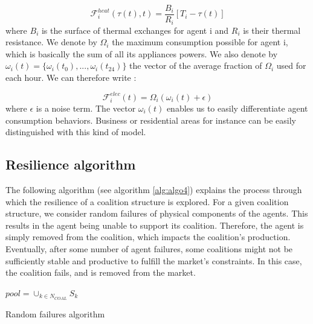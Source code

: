 \documentclass[journal]{IEEEtran}
\begin{document}
\begin{equation}
\mathcal{F}_{i}^{heat}(\tau(t), t) = \dfrac{B_{i}}{R_{i}} \left[ T_{i} - \tau(t) \right]
\end{equation}
where $ B_{i} $ is the surface of thermal exchanges for agent i and $ R_{i} $ is their thermal resistance. We denote by $ \Omega_{i} $ the maximum consumption possible for agent i, which is basically the sum of all its appliances powers. We also denote by $ \omega_{i}(t) = \{ \omega_{i}(t_{0}),...,\omega_{i}(t_{24}) \} $ the vector of the average fraction of $ \Omega_{i} $ used for each hour. We can therefore write :

\begin{equation}
\mathcal{F}_{i}^{elec}(t) = \Omega_{i} ( \omega_{i}(t) + \epsilon )
\end{equation}
where $ \epsilon $ is a noise term. The vector $ \omega_{i}(t) $ enables us to easily differentiate agent consumption behaviors. Business or residential areas for instance can be easily distinguished with this kind of model.

\subsection{Resilience algorithm}
\label{appendix_resilience}
The following algorithm (see algorithm \ref{alg:algo4}) explains the process through which the resilience of a coalition structure is explored. For a given coalition structure, we consider random failures of physical components of the agents. This results in the agent being unable to support its coalition. Therefore, the agent is simply removed from the coalition, which impacts the coalition's production. Eventually, after some number of agent failures, some coalitions might not be sufficiently stable and productive to fulfill the market's constraints. In this case, the coalition fails, and is removed from the market.
\begin{algorithm}
	
	$ pool = \cup_{k \in N_{COAL}} S_k $ \; 
	\caption{Random failures algorithm}
\label{alg:algo4}
\end{algorithm}
\end{document}
